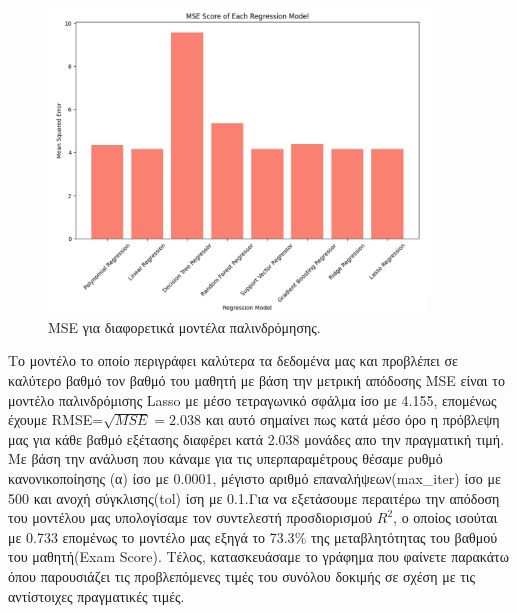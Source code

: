 \documentclass[12pt]{article}
\begin{document}
\begin{figure}
    \centering 
    \includegraphics[width=0.9\textwidth]{./images/icon9.jpg}
    \caption{MSE για διαφορετικά μοντέλα παλινδρόμησης.}
    \label{fig:MSE} 
    
\end{figure}

Το μοντέλο το οποίο περιγράφει καλύτερα τα δεδομένα μας και προβλέπει σε καλύτερο βαθμό τον βαθμό του μαθητή με βάση την μετρική απόδοσης MSE είναι το μοντέλο παλινδρόμισης Lasso με μέσο τετραγωνικό σφάλμα ίσο με 4.155, επομένως έχουμε RMSE=\(\sqrt{MSE}=2.038\) και αυτό σημαίνει πως κατά μέσο όρο η πρόβλεψη μας για κάθε βαθμό εξέτασης διαφέρει κατά 2.038 μονάδες απο την πραγματική τιμή. Με βάση την ανάλυση που κάναμε για τις υπερπαραμέτρους θέσαμε ρυθμό κανονικοποίησης (α) ίσο με 0.0001, μέγιστο αριθμό επαναλήψεων(max\_iter) ίσο με 500 και ανοχή σύγκλισης(tol) ίση με 0.1.Για να εξετάσουμε περαιτέρω την απόδοση του μοντέλου μας υπολογίσαμε τον συντελεστή προσδιορισμού \( R^2 \), ο οποίος ισούται με 0.733  επομένως το μοντέλο μας εξηγά το 73.3\(\%\) της μεταβλητότητας του βαθμού του μαθητή(Exam Score). Τέλος, κατασκευάσαμε το γράφημα που φαίνετε παρακάτω όπου παρουσιάζει τις προβλεπόμενες τιμές του συνόλου δοκιμής σε σχέση με τις αντίστοιχες πραγματικές τιμές. 
\end{document}
